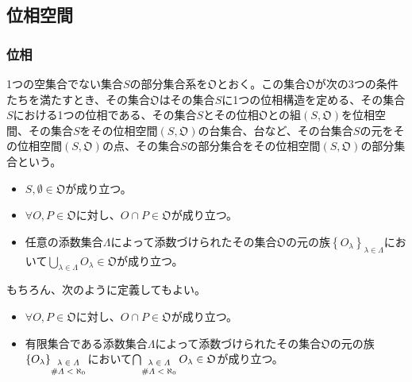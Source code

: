 \documentclass[dvipdfmx]{jsarticle}
\begin{document}
\subsection{位相空間}%
\subsubsection{位相}%
\begin{dfn}
1つの空集合でない集合$S$の部分集合系を$\mathfrak{O}$とおく。この集合$\mathfrak{O}$が次の3つの条件たちを満たすとき、その集合$\mathfrak{O}$はその集合$S$に1つの位相構造を定める、その集合$S$における1つの位相である、その集合$S$とその位相$\mathfrak{O}$との組$\left( S,\mathfrak{O} \right)$を位相空間、その集合$S$をその位相空間$\left( S,\mathfrak{O} \right)$の台集合、台など、その台集合$S$の元をその位相空間$\left( S,\mathfrak{O} \right)$の点、その集合$S$の部分集合をその位相空間$\left( S,\mathfrak{O} \right)$の部分集合という。
\begin{itemize}
\item
  $S,\emptyset \in \mathfrak{O}$が成り立つ。
\item
  $\forall O,P \in \mathfrak{O}$に対し、$O \cap P\in \mathfrak{O}$が成り立つ。
\item
  任意の添数集合$\varLambda$によって添数づけられたその集合$\mathfrak{O}$の元の族$\left\{ O_{\lambda} \right\}_{\lambda \in \varLambda}$において$\bigcup_{\lambda \in \varLambda} O_{\lambda}\in \mathfrak{O}$が成り立つ。
\end{itemize}
\end{dfn}\par
もちろん、次のように定義してもよい。
\begin{itemize}
\item
  $\forall O,P \in \mathfrak{O}$に対し、$O \cap P\in \mathfrak{O}$が成り立つ。
\item
  有限集合である添数集合$\varLambda$によって添数づけられたその集合$\mathfrak{O}$の元の族$\left\{ O_{\lambda} \right\}_{\scriptsize \begin{matrix}
  \lambda \in \varLambda \\
  {\#}\varLambda < \aleph_{0} \\
  \end{matrix}}$において$\bigcap_{\scriptsize \begin{matrix}
  \lambda \in \varLambda \\
  {\#}\varLambda < \aleph_{0} \\
  \end{matrix}} O_{\lambda}\in \mathfrak{O}$が成り立つ。
\end{itemize}\par
\end{document}
